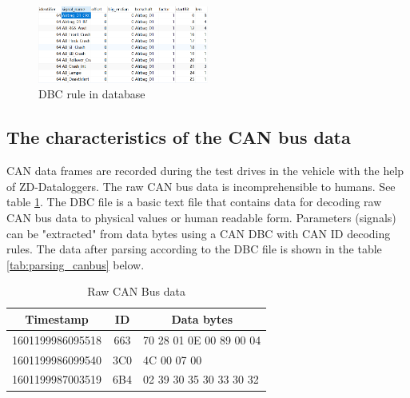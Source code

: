 \begin{figure}[hbt!]
\centering
\includegraphics[width=0.5\textwidth]{gfx/dbc_database.png}
\caption{DBC rule in database}
\label{fig:dbc_rule}
\end{figure}

\subsection{The characteristics of the CAN bus data}

CAN data frames are recorded during the test drives in the vehicle with the help of ZD-Dataloggers. The raw CAN bus data is incomprehensible to humans. See table \ref{tab:raw_canbus}. The DBC file is a basic text file that contains data for decoding raw CAN bus data to physical values or human readable form. Parameters (signals) can be "extracted" from data bytes using a CAN DBC with CAN ID decoding rules. The data after parsing according to the DBC file is shown in the table \ref{tab:parsing_canbus} below.


\begin{table}[hbt!]
\centering
\begin{tabular}{@{}ccl@{}}
\toprule
\textbf{Timestamp} & \textbf{ID} & \multicolumn{1}{c}{\textbf{Data bytes}} \\ \midrule
1601199986095518   & 663         & 70 28 01 0E 00 89 00 04                 \\
1601199986099540   & 3C0         & 4C 00 07 00                             \\
1601199987003519   & 6B4         & 02 39 30 35 30 33 30 32                 \\ \bottomrule
\end{tabular}
\caption{Raw CAN Bus data}
\label{tab:raw_canbus}
\end{table}


